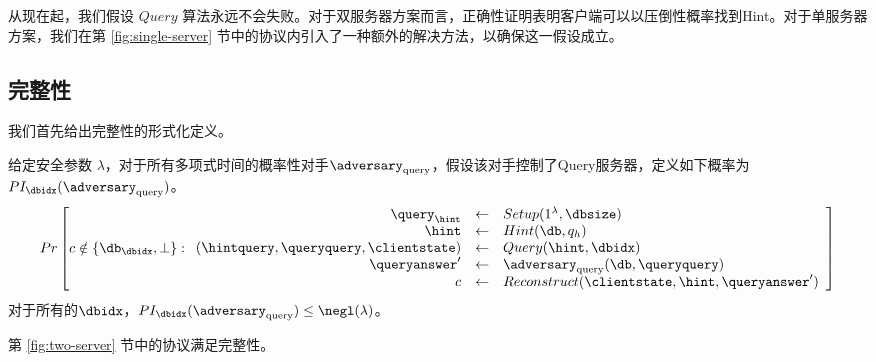 从现在起，我们假设 $Query$ 算法永远不会失败。对于双服务器方案而言，正确性证明表明客户端可以以压倒性概率找到Hint。对于单服务器方案，我们在第 \ref{fig:single-server} 节中的协议内引入了一种额外的解决方法，以确保这一假设成立。

\subsection{完整性}
\label{appendix:integrity}

我们首先给出完整性的形式化定义。

\begin{definition}[双服务器方案的完整性]
给定安全参数 $\lambda$，对于所有多项式时间的概率性对手$\adversary_{\mathrm{query}}$，假设该对手控制了Query服务器，定义如下概率为$PI_\dbidx(\adversary_{\mathrm{query}})$。
            $$ Pr\left[
            c \notin \{\db_\dbidx,\bot\}:
            \begin{array}{rcl}
                \query_\hint                          & \leftarrow & Setup(1^\lambda, \dbsize)                       \\
                \hint                                 & \leftarrow & Hint(\db, q_h)                                  \\
                (\hintquery,\queryquery,\clientstate) & \leftarrow & Query(\hint, \dbidx)                            \\
                \queryanswer'                         & \leftarrow & \adversary_{\mathrm{query}}(\db, \queryquery)   \\
                c                                     & \leftarrow & Reconstruct(\clientstate, \hint, \queryanswer') \\
            \end{array}
            \right]$$
对于所有的$\dbidx$，$PI_\dbidx(\adversary_{\mathrm{query}}) \leq \negl(\lambda)$。
\end{definition}

\begin{theorem}
    第 \ref{fig:two-server} 节中的协议满足完整性。
\end{theorem}

